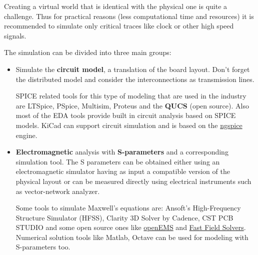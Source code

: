 \documentclass[12pt]{article}
\begin{document}

Creating a virtual world that is identical with the physical one is quite a challenge. Thus for practical reasons (less computational time and resources) it is recommended to simulate only critical traces like clock or other high speed signals.

The simulation can be divided into three main groups: 

\begin{itemize}
	\item Simulate the \textbf{circuit model}, a translation of the board layout. 
	Don't forget the distributed model and consider the interconnections as transmission lines.
	
	SPICE related tools for this type of modeling that are used in the industry are LTSpice, PSpice, Multisim, Proteus and the \textbf{QUCS} (open source). Also most of the EDA tools provide built in circuit analysis based on SPICE models. KiCad can support circuit simulation and is based on the \href{http://ngspice.sourceforge.net/ngspice-eeschema.html}{ngspice} engine.
	
	
	
	\item \textbf{Electromagnetic} analysis with \textbf{S-parameters} and a corresponding simulation tool. The S parameters can be obtained either using an electromagnetic simulator having as input a compatible version of the physical layout or can be measured directly using electrical instruments such as vector-network analyzer. 
	
	Some tools to simulate Maxwell's equations are: Ansoft’s High-Frequency Structure Simulator (HFSS), Clarity 3D Solver by Cadence, CST PCB STUDIO and some open source ones like \href{https://www.opensourceimaging.org/project/open-ems-a-free-and-open-electromagnetic-field-solver/}{openEMS} and \href{https://www.fastfieldsolvers.com/}{Fast Field Solvers}.
	Numerical solution tools like Matlab, Octave can be used for modeling with S-parameters too.
	

\end{itemize}
\end{document}
